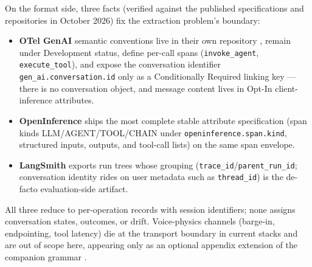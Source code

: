 On the format side, three facts (verified against the published specifications and
repositories in October 2026) fix the extraction problem's boundary:
\begin{itemize}
  \item \textbf{OTel GenAI} semantic conventions live in their own repository
        \citep{otelgenai2026}, remain under Development status, define per-call spans
        (\texttt{invoke\_agent}, \texttt{execute\_tool}), and expose the conversation
        identifier \texttt{gen\_ai.conversation.id} only as a Conditionally Required linking
        key --- there is no conversation object, and message content lives in Opt-In
        client-inference attributes.
  \item \textbf{OpenInference} \citep{openinference2026} ships the most complete stable
        attribute specification (span kinds LLM/AGENT/TOOL/CHAIN under
        \texttt{openinference.span.kind}, structured inputs, outputs, and tool-call lists)
        on the same span envelope.
  \item \textbf{LangSmith} \citep{langsmith2026} exports run trees whose grouping
        (\texttt{trace\_id}/\texttt{parent\_run\_id}; conversation identity rides on user
        metadata such as \texttt{thread\_id}) is the de-facto evaluation-side artifact.
\end{itemize}
All three reduce to per-operation records with session identifiers; none assigns
conversation states, outcomes, or drift.
Voice-physics channels (barge-in, endpointing, tool latency) die at the transport boundary in
current stacks and are out of scope here, appearing only as an optional appendix extension of
the companion grammar \citep{garcia2026grammar}.

